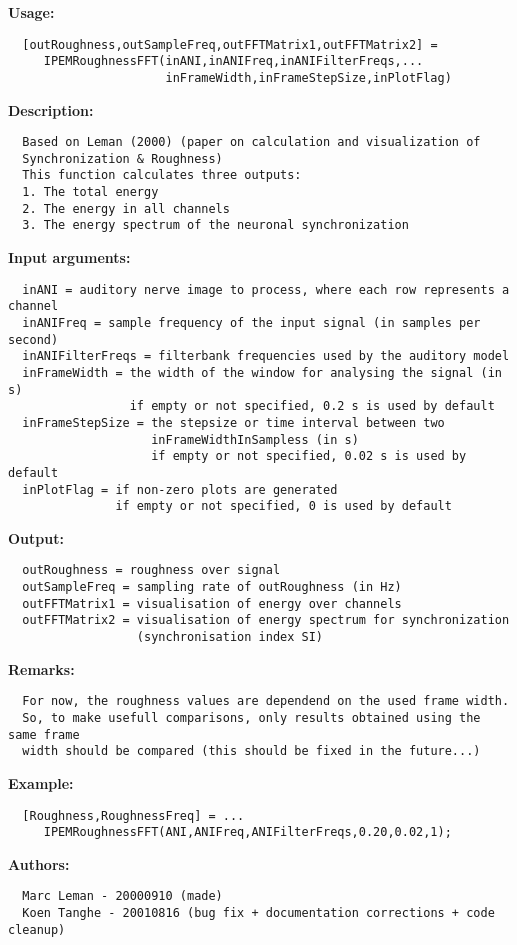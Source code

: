 \textbf{Usage:}
\begin{verbatim}  [outRoughness,outSampleFreq,outFFTMatrix1,outFFTMatrix2] =
     IPEMRoughnessFFT(inANI,inANIFreq,inANIFilterFreqs,...
                      inFrameWidth,inFrameStepSize,inPlotFlag)

\end{verbatim}
\textbf{Description:}
\begin{verbatim}  Based on Leman (2000) (paper on calculation and visualization of
  Synchronization & Roughness)
  This function calculates three outputs:
  1. The total energy
  2. The energy in all channels
  3. The energy spectrum of the neuronal synchronization 

\end{verbatim}
\textbf{Input arguments:}
\begin{verbatim}  inANI = auditory nerve image to process, where each row represents a channel
  inANIFreq = sample frequency of the input signal (in samples per second)
  inANIFilterFreqs = filterbank frequencies used by the auditory model
  inFrameWidth = the width of the window for analysing the signal (in s)
                 if empty or not specified, 0.2 s is used by default
  inFrameStepSize = the stepsize or time interval between two
                    inFrameWidthInSampless (in s)
                    if empty or not specified, 0.02 s is used by default
  inPlotFlag = if non-zero plots are generated
               if empty or not specified, 0 is used by default

\end{verbatim}
\textbf{Output:}
\begin{verbatim}  outRoughness = roughness over signal
  outSampleFreq = sampling rate of outRoughness (in Hz)
  outFFTMatrix1 = visualisation of energy over channels
  outFFTMatrix2 = visualisation of energy spectrum for synchronization
                  (synchronisation index SI)

\end{verbatim}
\textbf{Remarks:}
\begin{verbatim}  For now, the roughness values are dependend on the used frame width.
  So, to make usefull comparisons, only results obtained using the same frame
  width should be compared (this should be fixed in the future...)

\end{verbatim}
\textbf{Example:}
\begin{verbatim}  [Roughness,RoughnessFreq] = ...
     IPEMRoughnessFFT(ANI,ANIFreq,ANIFilterFreqs,0.20,0.02,1);

\end{verbatim}
\textbf{Authors:}
\begin{verbatim}  Marc Leman - 20000910 (made)
  Koen Tanghe - 20010816 (bug fix + documentation corrections + code cleanup)
\end{verbatim}


